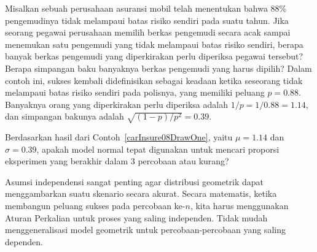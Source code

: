\D{\newpage}

\begin{examplewrap}
\begin{nexample}{Misalkan sebuah perusahaan asuransi mobil telah
    menentukan bahwa 88\% pengemudinya tidak melampaui batas risiko sendiri
    pada suatu tahun. Jika seorang pegawai perusahaan memilih berkas
    pengemudi secara acak sampai menemukan satu pengemudi yang tidak
    melampaui batas risiko sendiri, berapa banyak berkas pengemudi yang
    diperkirakan perlu diperiksa pegawai tersebut? Berapa simpangan baku
    banyaknya berkas pengemudi yang harus dipilih?}
  \label{carInsure08DrawOne}%
  Dalam contoh ini, sukses kembali didefinisikan sebagai keadaan ketika
  seseorang tidak melampaui batas risiko sendiri pada polisnya, yang memiliki
  peluang $p = 0.88$. Banyaknya orang yang diperkirakan perlu diperiksa
  adalah $1 / p = 1 / 0.88 = 1.14$, dan simpangan bakunya adalah
  $\sqrt{(1-p)/p^2} = 0.39$.
\end{nexample}
\end{examplewrap}

\begin{exercisewrap}
\begin{nexercise}
Berdasarkan hasil dari Contoh~\ref{carInsure08DrawOne}, yaitu
$\mu = 1.14$ dan $\sigma = 0.39$, apakah model normal tepat digunakan
untuk mencari proporsi eksperimen yang berakhir dalam 3 percobaan atau
kurang?\footnotemark{}
\end{nexercise}
\end{exercisewrap}

Asumsi independensi sangat penting agar distribusi geometrik dapat
menggambarkan suatu skenario secara akurat. Secara matematis, ketika
membangun peluang sukses pada percobaan ke-$n$, kita harus menggunakan
Aturan Perkalian untuk proses yang saling independen. Tidak mudah
menggeneralisasi model geometrik untuk percobaan-percobaan yang saling
dependen.



{}
